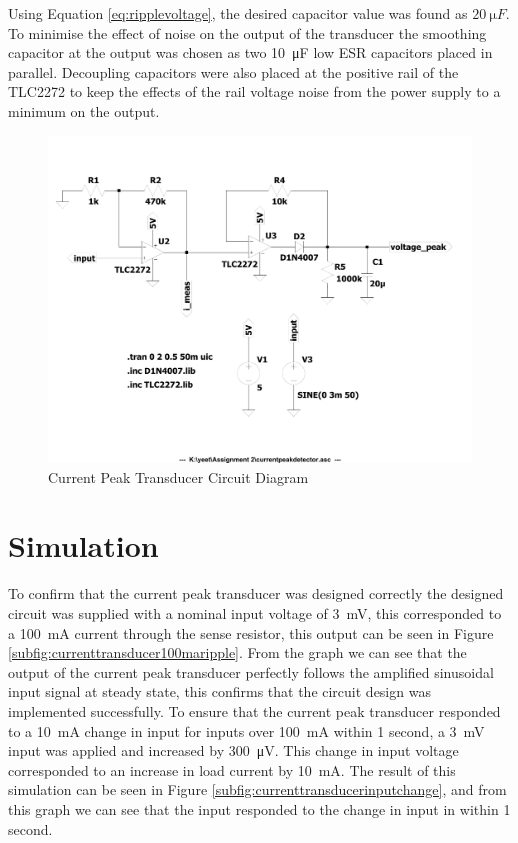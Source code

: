 Using Equation \ref{eq:ripplevoltage}, the desired capacitor value was found as $\SI{20}{\micro F}$. To minimise the effect of noise on the output of the transducer the smoothing capacitor at the output was chosen as two \SI{10}{\micro F} low ESR capacitors placed in parallel. Decoupling capacitors were also placed at the positive rail of the TLC2272 to keep the effects of the rail voltage noise from the power supply to a minimum on the output.
\begin{figure}[h]
    \centering
    \includegraphics[width = 0.85\linewidth]{Figures/currentpeakdetector.pdf}
        \caption{Current Peak Transducer Circuit Diagram}
    \label{fig:currentpeakdetector.pdf}
\end{figure}

\section{Simulation} \label{sec:simulation_current_peak_transducer}
To confirm that the current peak transducer was designed correctly the designed circuit was supplied with a nominal input voltage of \SI{3}{\milli \volt}, this corresponded to a \SI{100}{\milli A} current through the sense resistor, this output can be seen in Figure \ref{subfig:currenttransducer100maripple}. From the graph we can see that the output of the current peak transducer perfectly follows the amplified sinusoidal input signal at steady state, this confirms that the circuit design was implemented successfully. To ensure that the current peak transducer responded to a \SI{10}{\milli A} change in input for inputs over \SI{100}{\milli A} within 1 second, a \SI{3}{\milli \volt} input was applied and increased by \SI{300}{\micro \volt}. This change in input voltage corresponded to an increase in load current by \SI{10}{\milli A}. The result of this simulation can be seen in Figure \ref{subfig:currenttransducerinputchange}, and from this graph we can see that the input responded to the change in input in within 1 second. 

